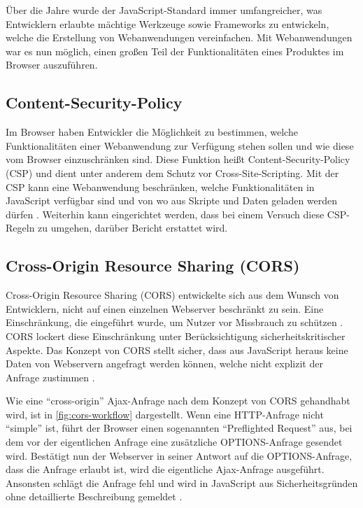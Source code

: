Über die Jahre wurde der JavaScript-Standard immer umfangreicher, was Entwicklern erlaubte mächtige Werkzeuge sowie Frameworks zu entwickeln, welche die Erstellung von Webanwendungen vereinfachen. Mit Webanwendungen war es nun möglich, einen großen Teil der Funktionalitäten eines Produktes im Browser auszuführen.

\subsection{Content-Security-Policy}


Im Browser haben Entwickler die Möglichkeit zu bestimmen, welche Funktionalitäten einer Webanwendung zur Verfügung stehen sollen und wie diese vom Browser einzuschränken sind. Diese Funktion heißt Content-Security-Policy (CSP) und dient unter anderem dem Schutz vor Cross-Site-Scripting. Mit der CSP kann eine Webanwendung beschränken, welche Funktionalitäten in JavaScript verfügbar sind und von wo aus Skripte und Daten geladen werden dürfen \cite{MDNContentSecurityPolicy}. Weiterhin kann eingerichtet werden, dass bei einem Versuch diese CSP-Regeln zu umgehen, darüber Bericht erstattet wird.

\subsection{Cross-Origin Resource Sharing (CORS)}

Cross-Origin Resource Sharing (CORS) \cite{AuthorizingCORS} entwickelte sich aus dem Wunsch von Entwicklern, nicht auf einen einzelnen Webserver beschränkt zu sein. Eine Einschränkung, die eingeführt wurde, um Nutzer vor Missbrauch zu schützen \cite{BrowserProtectionAgainstCSRF}. CORS lockert diese Einschränkung unter Berücksichtigung sicherheitskritischer Aspekte. Das Konzept von CORS stellt sicher, dass aus JavaScript heraus keine Daten von Webservern angefragt werden können, welche nicht explizit der Anfrage zustimmen \cite{MDNCORS}.

Wie eine \enquote{cross-origin} Ajax-Anfrage nach dem Konzept von CORS gehandhabt wird, ist in \autoref{fig:cors-workflow} dargestellt. Wenn eine HTTP-Anfrage nicht \enquote{simple}\footnotemark{} ist, führt der Browser einen sogenannten \enquote{Preflighted Request} aus, bei dem vor der eigentlichen Anfrage eine zusätzliche OPTIONS-Anfrage gesendet wird. Bestätigt nun der Webserver in seiner Antwort auf die OPTIONS-Anfrage, dass die Anfrage erlaubt ist, wird die eigentliche Ajax-Anfrage ausgeführt. Ansonsten schlägt die Anfrage fehl und wird in JavaScript aus Sicherheitsgründen ohne detaillierte Beschreibung gemeldet \cite{MDNCORS}.

